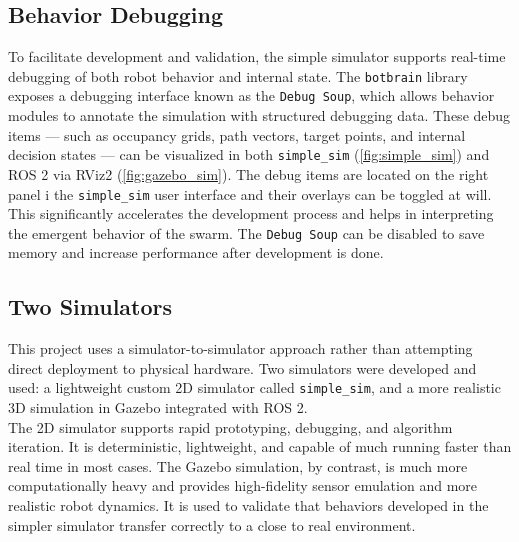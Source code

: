 \subsection{Behavior Debugging}
To facilitate development and validation, the simple simulator supports real-time debugging of both robot behavior and internal state. The \texttt{botbrain} library exposes a debugging interface known as the \texttt{Debug Soup}, which allows behavior modules to annotate the simulation with structured debugging data. These debug items --- such as occupancy grids, path vectors, target points, and internal decision states --- can be visualized in both \texttt{simple\_sim} (\cref{fig:simple_sim}) and ROS 2 via RViz2 (\cref{fig:gazebo_sim}). The debug items are located on the right panel i the \texttt{simple\_sim} user interface and their overlays can be toggled at will. This significantly accelerates the development process and helps in interpreting the emergent behavior of the swarm. The \texttt{Debug Soup} can be disabled to save memory and increase performance after development is done.

\subsection{Two Simulators}
This project uses a simulator-to-simulator approach rather than attempting direct deployment to physical hardware. Two simulators were developed and used: a lightweight custom 2D simulator called \texttt{simple\_sim}, and a more realistic 3D simulation in Gazebo integrated with ROS 2. \\

The 2D simulator supports rapid prototyping, debugging, and algorithm iteration. It is deterministic, lightweight, and capable of much running faster than real time in most cases. The Gazebo simulation, by contrast, is much more computationally heavy and provides high-fidelity sensor emulation and more realistic robot dynamics. It is used to validate that behaviors developed in the simpler simulator transfer correctly to a close to real environment. \\

